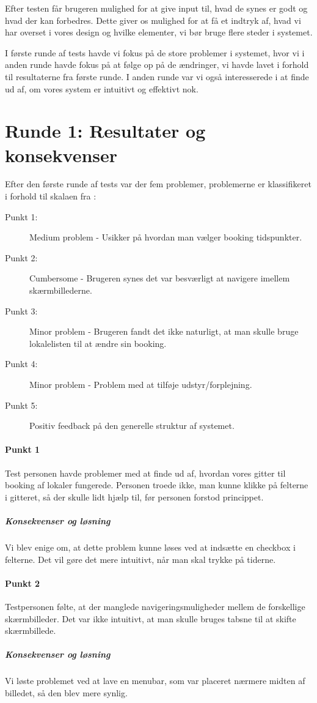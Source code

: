Efter testen får brugeren mulighed for at give input til, hvad de synes er godt og hvad der kan forbedres. Dette giver os mulighed for at få et indtryk af, hvad vi har overset i vores design og hvilke elementer, vi bør bruge flere steder i systemet.

I første runde af tests havde vi fokus på de store problemer i systemet, hvor vi i anden runde havde fokus på at følge op på de ændringer, vi havde lavet i forhold til resultaterne fra første runde. I anden runde var vi også interesserede i at finde ud af, om vores system er intuitivt og effektivt nok.

\section{Runde 1: Resultater og konsekvenser}
\label{Usability_R1}
Efter den første runde af tests var der fem problemer, problemerne er klassifikeret i forhold til skalaen fra \cite[s. 439]{SL_UID}:
\begin{description}
\item [Punkt 1:] Medium problem - Usikker på hvordan man vælger booking tidspunkter.
\item [Punkt 2:] Cumbersome - Brugeren synes det var besværligt at navigere imellem skærmbillederne.
\item [Punkt 3:] Minor problem - Brugeren fandt det ikke naturligt, at man skulle bruge lokalelisten til at ændre sin booking.
\item [Punkt 4:] Minor problem - Problem med at tilføje udstyr/forplejning.
\item [Punkt 5:] Positiv feedback på den generelle struktur af systemet.
\end{description}

\paragraph{Punkt 1}
Test personen havde problemer med at finde ud af, hvordan vores gitter til booking af lokaler fungerede. Personen troede ikke, man kunne klikke på felterne i gitteret, så der skulle lidt hjælp til, før personen forstod princippet.
\subparagraph{Konsekvenser og løsning}
Vi blev enige om, at dette problem kunne løses ved at indsætte en checkbox i felterne. Det vil gøre det mere intuitivt, når man skal trykke på tiderne.

\paragraph{Punkt 2}
Testpersonen følte, at der manglede navigeringsmuligheder mellem de forskellige skærmbilleder. Det var ikke intuitivt, at man skulle bruges tabsne til at skifte skærmbillede.
\subparagraph{Konsekvenser og løsning}
Vi løste problemet ved at lave en menubar, som var placeret nærmere midten af billedet, så den blev mere synlig.

